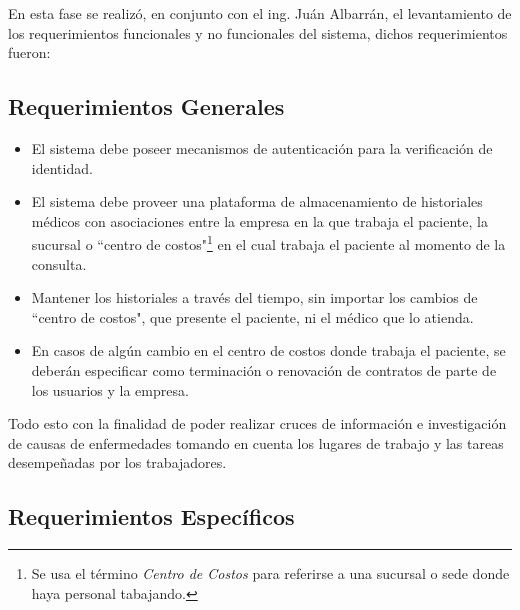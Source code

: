     En esta fase se realizó, en conjunto con el ing. Juán Albarrán, el levantamiento de los requerimientos funcionales y no funcionales del sistema, dichos requerimientos fueron:
    
    \subsection{Requerimientos Generales}
    \begin{itemize}
        \item El sistema debe poseer mecanismos de autenticación para la verificación de identidad.
        
        \item El sistema debe proveer una plataforma de almacenamiento de historiales médicos con asociaciones entre la empresa en la que trabaja el paciente, la sucursal o ``centro de costos"\footnote{Se usa el término \textit{Centro de Costos} para referirse a una sucursal o sede donde haya personal tabajando.} en el cual trabaja el paciente al momento de la consulta.
        
        \item Mantener los historiales a través del tiempo, sin importar los cambios de ``centro de costos", que presente el paciente, ni el médico que lo atienda.
        
        \item En casos de algún cambio en el centro de costos donde trabaja el paciente, se deberán especificar como terminación o renovación de contratos de parte de los usuarios y la empresa.

    \end{itemize}        
        
        Todo esto con la finalidad de poder realizar cruces de información e investigación de causas de enfermedades tomando en cuenta los lugares de trabajo y las tareas desempeñadas por los trabajadores.
        
    \subsection{Requerimientos Específicos}
    
